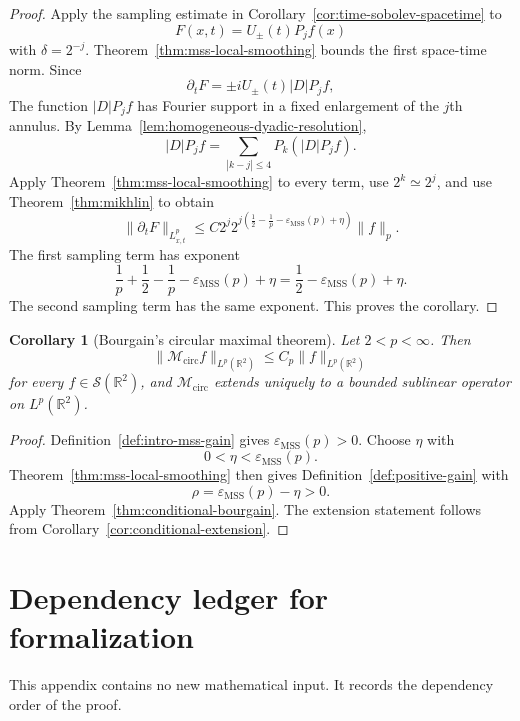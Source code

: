 \documentclass[11pt]{article}
\numberwithin{equation}{section}
\newtheorem{corollary}[theorem]{Corollary}
\theoremstyle{definition}
\theoremstyle{remark}
\newcommand{\R}{\mathbb R}
\newcommand{\Sch}{\mathcal S}
\newcommand{\Mcirc}{\mathcal M_{\mathrm{circ}}}
\newcommand{\epsMSS}{\varepsilon_{\mathrm{MSS}}}
\begin{document}
\begin{proof}
Apply the sampling estimate in Corollary~\ref{cor:time-sobolev-spacetime} to
\[
F(x,t)=U_\pm(t)P_jf(x)
\]
with $\delta=2^{-j}$.  Theorem~\ref{thm:mss-local-smoothing} bounds the first space-time norm.  Since
\[
\partial_tF=\pm iU_\pm(t)|D|P_jf,
\]
The function $|D|P_jf$ has Fourier support in a fixed enlargement of the $j$th annulus.  By Lemma~\ref{lem:homogeneous-dyadic-resolution},
\[
|D|P_jf=\sum_{|k-j|\le4}P_k(|D|P_jf).
\]
Apply Theorem~\ref{thm:mss-local-smoothing} to every term, use $2^k\simeq2^j$, and use Theorem~\ref{thm:mikhlin} to obtain
\[
\|\partial_tF\|_{L^p_{x,t}}
\le C2^j2^{j(\frac12-\frac1p-\epsMSS(p)+\eta)}\|f\|_p.
\]
The first sampling term has exponent
\[
\frac1p+\frac12-\frac1p-\epsMSS(p)+\eta
=\frac12-\epsMSS(p)+\eta.
\]
The second sampling term has the same exponent.  This proves the corollary.
\end{proof}

\begin{corollary}[Bourgain's circular maximal theorem]\label{cor:bourgain-final}
Let $2<p<\infty$.  Then
\[
\|\Mcirc f\|_{L^p(\R^2)}\le C_p\|f\|_{L^p(\R^2)}
\]
for every $f\in\Sch(\R^2)$, and $\Mcirc$ extends uniquely to a bounded sublinear operator on $L^p(\R^2)$.
\end{corollary}

\begin{proof}
Definition~\ref{def:intro-mss-gain} gives $\epsMSS(p)>0$.  Choose $\eta$ with
\[
0<\eta<\epsMSS(p).
\]
Theorem~\ref{thm:mss-local-smoothing} then gives Definition~\ref{def:positive-gain} with
\[
\rho=\epsMSS(p)-\eta>0.
\]
Apply Theorem~\ref{thm:conditional-bourgain}.  The extension statement follows from Corollary~\ref{cor:conditional-extension}.
\end{proof}

\appendix
\section{Dependency ledger for formalization}\label{sec:dependency-ledger}

This appendix contains no new mathematical input.  It records the dependency order of the proof.
\end{document}
